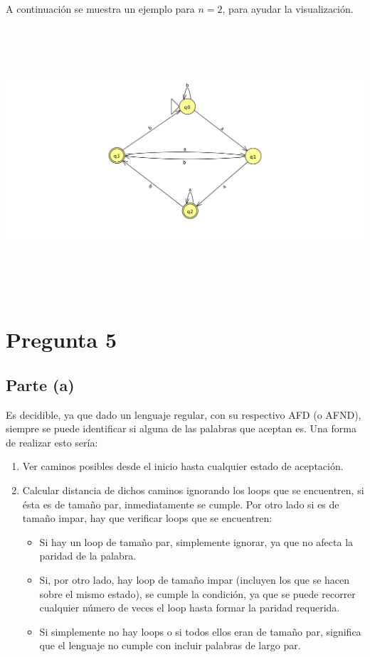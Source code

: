 \documentclass[11pt,letterpaper]{article}
\begin{document}
A continuación se muestra un ejemplo para $n = 2$, para ayudar la visualización.

\includegraphics[height=10cm]{tarea_4-b.png}


\section{Pregunta 5}
\subsection{Parte (a)}
Es decidible, ya que dado un lenguaje regular, con su respectivo AFD (o AFND), siempre se puede identificar si alguna de las palabras que aceptan es. Una forma de realizar esto sería:

\begin{enumerate}
	\item Ver caminos posibles desde el inicio hasta cualquier estado de aceptación.
	\item Calcular distancia de dichos caminos ignorando los loops que se encuentren, si ésta es de tamaño par, inmediatamente se cumple. Por otro lado si es de tamaño impar, hay que verificar loops que se encuentren:
	\begin{itemize}
		\item Si hay un loop de tamaño par, simplemente ignorar, ya que no afecta la paridad de la palabra.
		\item Si, por otro lado, hay loop de tamaño impar (incluyen los que se hacen sobre el mismo estado), se cumple la condición, ya que se puede recorrer cualquier número de veces el loop hasta formar la paridad requerida.
		\item Si simplemente no hay loops o si todos ellos eran de tamaño par, significa que el lenguaje no cumple con incluir palabras de largo par.
	\end{itemize}
\end{enumerate}
\end{document}
